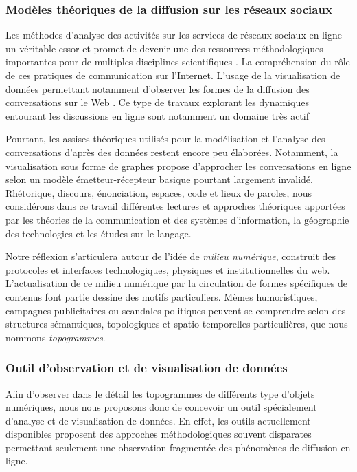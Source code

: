 \subsubsection{Modèles théoriques de la diffusion sur les réseaux sociaux}

Les méthodes d'analyse des activités sur les services de réseaux sociaux en ligne un véritable essor et promet de devenir une des ressources méthodologiques importantes pour de multiples disciplines scientifiques \cite{Nettleton2013}. La compréhension du rôle de ces pratiques de communication sur l'Internet. L'usage de la visualisation de données permettant notamment d'observer les formes de la diffusion des conversations sur le Web \cite{Russell, Adams2012}. Ce type de travaux explorant les dynamiques entourant les discussions en ligne sont notamment un domaine très actif \cite{Nettleton2013} 
 
Pourtant, les assises théoriques utilisés pour la modélisation et l'analyse des conversations d'après des données restent encore peu élaborées. Notamment, la visualisation sous forme de graphes propose d'approcher les conversations en ligne selon un modèle émetteur-récepteur basique pourtant largement invalidé. Rhétorique, discours, énonciation, espaces, code et lieux de paroles, nous considérons dans ce travail différentes lectures et approches théoriques apportées par les théories de la communication et des systèmes d'information, la géographie des technologies et les études sur le langage.

Notre réflexion s'articulera autour de l'idée de \textit{milieu numérique}, construit des protocoles et interfaces technologiques, physiques et institutionnelles du web. L'actualisation de ce milieu numérique par la circulation de formes spécifiques de contenus font partie dessine des motifs particuliers. Mèmes humoristiques, campagnes publicitaires ou scandales politiques peuvent se comprendre selon des structures sémantiques, topologiques et spatio-temporelles particulières, que nous nommons \textit{topogrammes}.

\subsubsection{Outil d'observation et de visualisation de données}

Afin d'observer dans le détail les topogrammes de différents type d'objets numériques, nous nous proposons donc de concevoir un outil spécialement d'analyse et de visualisation de données. En effet, les outils actuellement disponibles proposent des approches méthodologiques souvent disparates permettant seulement une observation fragmentée des phénomènes de diffusion en ligne. 

